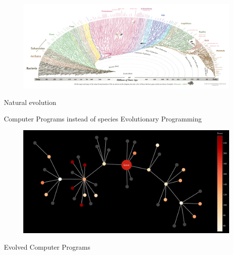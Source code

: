 \documentclass[aspectratio=169]{beamer}
\makeatletter
\renewcommand{\emphasis}[1]{{\Huge \color{pureminimalistic@text@red} #1}}
\newcommand{\red}[1]{{\color{pureminimalistic@text@red} #1}}
\makeatother
\begin{document}
{
\begin{frame}[plain]
  
  \begin{figure}
  \centering
  \includegraphics[width=1.0\linewidth,keepaspectratio]{figures/tree_of_life.png}
  \end{figure}
  \begin{center}
      \emphasis{Natural evolution}
  \end{center}
\end{frame}
}

\begin{frame}[plain]{}
  \centering
  \vfill
  \red{\fontsize{40}{50}\selectfont Computer Programs instead of species}
  \vfill
  \Huge Evolutionary Programming
\end{frame}

\begin{frame}[plain]
  \begin{figure}
  \centering
  \includegraphics[width=1.0\linewidth,keepaspectratio]{figures/unlabeled_tree.pdf}
  \end{figure}
  \begin{center}
  \emphasis{Evolved Computer Programs}
  \end{center}
\end{frame}
\end{document}
